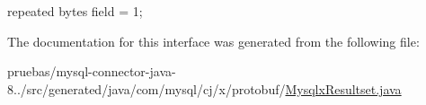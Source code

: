 {\ttfamily repeated bytes field = 1;} 

The documentation for this interface was generated from the following file\+:\begin{DoxyCompactItemize}
\item 
pruebas/mysql-\/connector-\/java-\/8../src/generated/java/com/mysql/cj/x/protobuf/\mbox{\hyperlink{_mysqlx_resultset_8java}{Mysqlx\+Resultset.\+java}}\end{DoxyCompactItemize}

